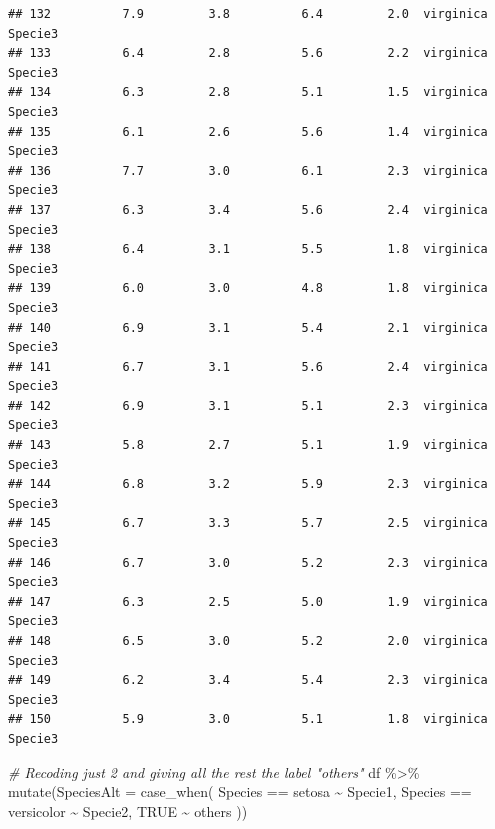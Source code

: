 \documentclass[
]{book}
\newenvironment{Shaded}{\begin{snugshade}}{\end{snugshade}}
\newcommand{\AttributeTok}[1]{\textcolor[rgb]{0.77,0.63,0.00}{#1}}
\newcommand{\CommentTok}[1]{\textcolor[rgb]{0.56,0.35,0.01}{\textit{#1}}}
\newcommand{\ConstantTok}[1]{\textcolor[rgb]{0.00,0.00,0.00}{#1}}
\newcommand{\FunctionTok}[1]{\textcolor[rgb]{0.00,0.00,0.00}{#1}}
\newcommand{\NormalTok}[1]{#1}
\newcommand{\SpecialCharTok}[1]{\textcolor[rgb]{0.00,0.00,0.00}{#1}}
\newcommand{\StringTok}[1]{\textcolor[rgb]{0.31,0.60,0.02}{#1}}
\begin{document}
\begin{verbatim}
## 132          7.9         3.8          6.4         2.0  virginica    Specie3
## 133          6.4         2.8          5.6         2.2  virginica    Specie3
## 134          6.3         2.8          5.1         1.5  virginica    Specie3
## 135          6.1         2.6          5.6         1.4  virginica    Specie3
## 136          7.7         3.0          6.1         2.3  virginica    Specie3
## 137          6.3         3.4          5.6         2.4  virginica    Specie3
## 138          6.4         3.1          5.5         1.8  virginica    Specie3
## 139          6.0         3.0          4.8         1.8  virginica    Specie3
## 140          6.9         3.1          5.4         2.1  virginica    Specie3
## 141          6.7         3.1          5.6         2.4  virginica    Specie3
## 142          6.9         3.1          5.1         2.3  virginica    Specie3
## 143          5.8         2.7          5.1         1.9  virginica    Specie3
## 144          6.8         3.2          5.9         2.3  virginica    Specie3
## 145          6.7         3.3          5.7         2.5  virginica    Specie3
## 146          6.7         3.0          5.2         2.3  virginica    Specie3
## 147          6.3         2.5          5.0         1.9  virginica    Specie3
## 148          6.5         3.0          5.2         2.0  virginica    Specie3
## 149          6.2         3.4          5.4         2.3  virginica    Specie3
## 150          5.9         3.0          5.1         1.8  virginica    Specie3
\end{verbatim}

\begin{Shaded}
\begin{Highlighting}[]
\CommentTok{\# Recoding just 2 and giving all the rest the label "others"}
\NormalTok{df }\SpecialCharTok{\%\textgreater{}\%} 
  \FunctionTok{mutate}\NormalTok{(}\AttributeTok{SpeciesAlt =} \FunctionTok{case\_when}\NormalTok{(}
\NormalTok{    Species }\SpecialCharTok{==} \StringTok{\textquotesingle{}setosa\textquotesingle{}} \SpecialCharTok{\textasciitilde{}} \StringTok{\textquotesingle{}Specie1\textquotesingle{}}\NormalTok{,}
\NormalTok{    Species }\SpecialCharTok{==} \StringTok{\textquotesingle{}versicolor\textquotesingle{}} \SpecialCharTok{\textasciitilde{}} \StringTok{\textquotesingle{}Specie2\textquotesingle{}}\NormalTok{,}
    \ConstantTok{TRUE} \SpecialCharTok{\textasciitilde{}} \StringTok{\textquotesingle{}others\textquotesingle{}}
\NormalTok{  ))}
\end{Highlighting}
\end{Shaded}
\end{document}
